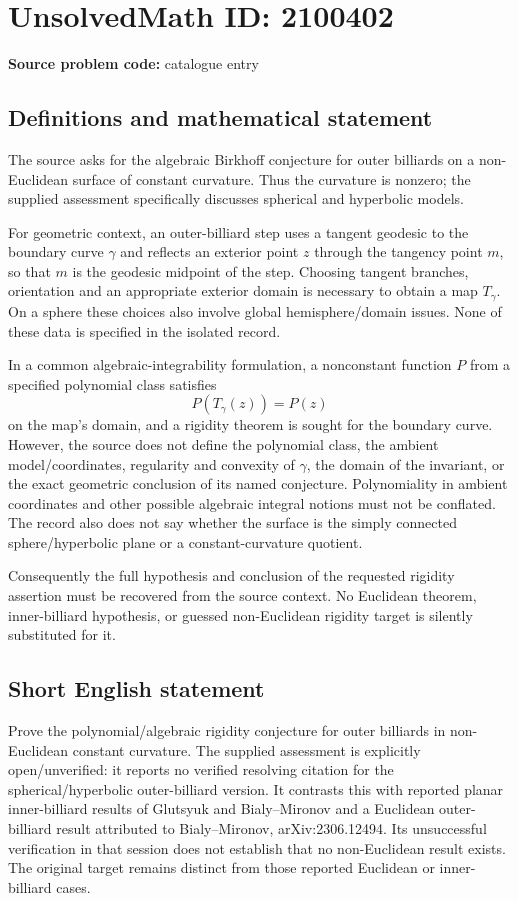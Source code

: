 \documentclass[11pt]{article}
\begin{document}
\section*{UnsolvedMath ID: 2100402}
\textbf{Source problem code:} catalogue entry
\subsection{Definitions and mathematical statement}
The source asks for the algebraic Birkhoff conjecture for outer billiards on a non-Euclidean surface of constant curvature. Thus the curvature is nonzero; the supplied assessment specifically discusses spherical and hyperbolic models.

For geometric context, an outer-billiard step uses a tangent geodesic to the boundary curve $\gamma$ and reflects an exterior point $z$ through the tangency point $m$, so that $m$ is the geodesic midpoint of the step. Choosing tangent branches, orientation and an appropriate exterior domain is necessary to obtain a map $T_\gamma$. On a sphere these choices also involve global hemisphere/domain issues. None of these data is specified in the isolated record.

In a common algebraic-integrability formulation, a nonconstant function $P$ from a specified polynomial class satisfies
\[
 P(T_\gamma(z))=P(z)
\]
on the map's domain, and a rigidity theorem is sought for the boundary curve. However, the source does not define the polynomial class, the ambient model/coordinates, regularity and convexity of $\gamma$, the domain of the invariant, or the exact geometric conclusion of its named conjecture. Polynomiality in ambient coordinates and other possible algebraic integral notions must not be conflated. The record also does not say whether the surface is the simply connected sphere/hyperbolic plane or a constant-curvature quotient.

Consequently the full hypothesis and conclusion of the requested rigidity assertion must be recovered from the source context. No Euclidean theorem, inner-billiard hypothesis, or guessed non-Euclidean rigidity target is silently substituted for it.
\subsection{Short English statement}
Prove the polynomial/algebraic rigidity conjecture for outer billiards in non-Euclidean constant curvature. The supplied assessment is explicitly open/unverified: it reports no verified resolving citation for the spherical/hyperbolic outer-billiard version. It contrasts this with reported planar inner-billiard results of Glutsyuk and Bialy--Mironov and a Euclidean outer-billiard result attributed to Bialy--Mironov, arXiv:2306.12494. Its unsuccessful verification in that session does not establish that no non-Euclidean result exists. The original target remains distinct from those reported Euclidean or inner-billiard cases.
\end{document}
